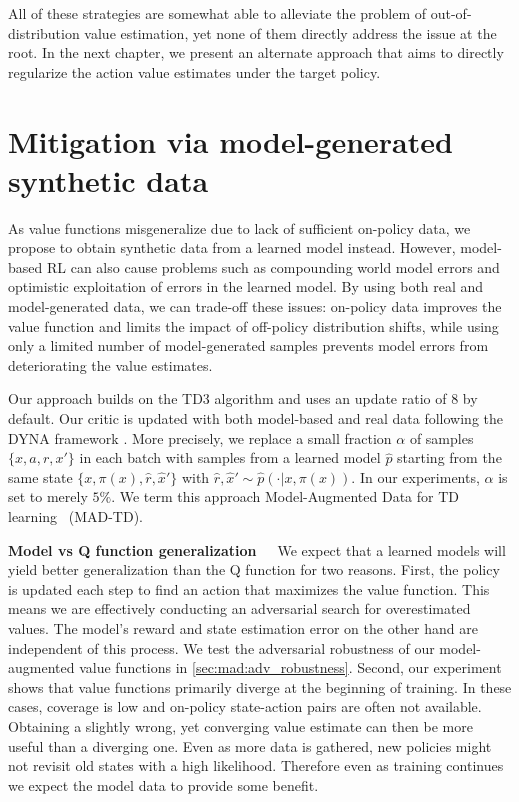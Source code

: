 All of these strategies are somewhat able to alleviate the problem of out-of-distribution value estimation, yet none of them directly address the issue at the root.
In the next chapter, we present an alternate approach that aims to directly regularize the action value estimates under the target policy.

\section{Mitigation via model-generated synthetic data}

As value functions misgeneralize due to lack of sufficient on-policy data, we propose to obtain synthetic data from a learned model instead.
However, model-based RL can also cause problems such as compounding world model errors and optimistic exploitation of errors in the learned model. 
By using both real and model-generated data, we can trade-off these issues: on-policy data improves the value function and limits the impact of off-policy distribution shifts, while using only a limited number of model-generated samples prevents model errors from deteriorating the value estimates. 

Our approach builds on the TD3 algorithm \parencite{fujimoto2018addressing} and uses an update ratio of 8 by default. 
Our critic is updated with both model-based and real data following the DYNA framework \parencite{dyna}.
More precisely, we replace a small fraction $\alpha$ of samples $\{x,a,r,x'\}$ in each batch with samples from a learned model $\hat{p}$ starting from the same state $\{x, \pi(x), \hat{r} ,\hat{x}'\}$ with $\hat{r}, \hat{x}' \sim \hat{p}(\cdot|x, \pi(x))$. In our experiments, $\alpha$ is set to merely $5\%$.
We term this approach Model-Augmented Data for TD learning ~(MAD-TD).%

\textbf{Model vs Q function generalization}~~~We expect that a learned models will yield better generalization than the Q function for two reasons.
First, the policy is updated each step to find an action that maximizes the value function.
This means we are effectively conducting an adversarial search for overestimated values.
The model's reward and state estimation error on the other hand are independent of this process.
We test the adversarial robustness of our model-augmented value functions in \autoref{sec:mad:adv_robustness}.
Second, our experiment shows that value functions primarily diverge at the beginning of training.
In these cases, coverage is low and on-policy state-action pairs are often not available.
Obtaining a slightly wrong, yet converging value estimate can then be more useful than a diverging one. 
Even as more data is gathered, new policies might not revisit old states with a high likelihood.
Therefore even as training continues we expect the model data to provide some benefit.

